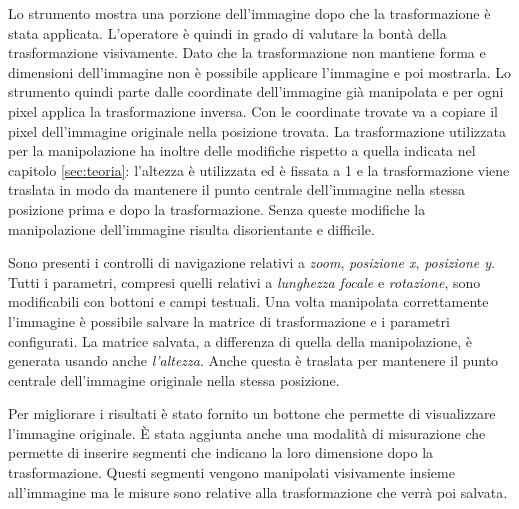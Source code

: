 Lo strumento mostra una porzione dell'immagine dopo che la trasformazione è stata applicata.
L'operatore è quindi in grado di valutare la bontà della trasformazione visivamente.
Dato che la trasformazione non mantiene forma e dimensioni dell'immagine non è possibile applicare l'immagine e poi mostrarla.
Lo strumento quindi parte dalle coordinate dell'immagine già manipolata e per ogni pixel applica la trasformazione inversa.
Con le coordinate trovate va a copiare il pixel dell'immagine originale nella posizione trovata.
La trasformazione utilizzata per la manipolazione ha inoltre delle modifiche rispetto a quella indicata nel capitolo \ref{sec:teoria}: l'altezza è utilizzata ed è fissata a 1 e la trasformazione viene traslata in modo da mantenere il punto centrale dell'immagine nella stessa posizione prima e dopo la trasformazione.
Senza queste modifiche la manipolazione dell'immagine risulta disorientante e difficile.

Sono presenti i controlli di navigazione relativi a \emph{zoom}, \emph{posizione x}, \emph{posizione y}.
Tutti i parametri, compresi quelli relativi a \emph{lunghezza focale} e \emph{rotazione}, sono modificabili con bottoni e campi testuali.
Una volta manipolata correttamente l'immagine è possibile salvare la matrice di trasformazione e i parametri configurati.
La matrice salvata, a differenza di quella della manipolazione, è generata usando anche \emph{l'altezza}.
Anche questa è traslata per mantenere il punto centrale dell'immagine originale nella stessa posizione.

Per migliorare i risultati è stato fornito un bottone che permette di visualizzare l'immagine originale.
È stata aggiunta anche una modalità di misurazione che permette di inserire segmenti che indicano la loro dimensione dopo la trasformazione.
Questi segmenti vengono manipolati visivamente insieme all'immagine ma le misure sono relative alla trasformazione che verrà poi salvata.
